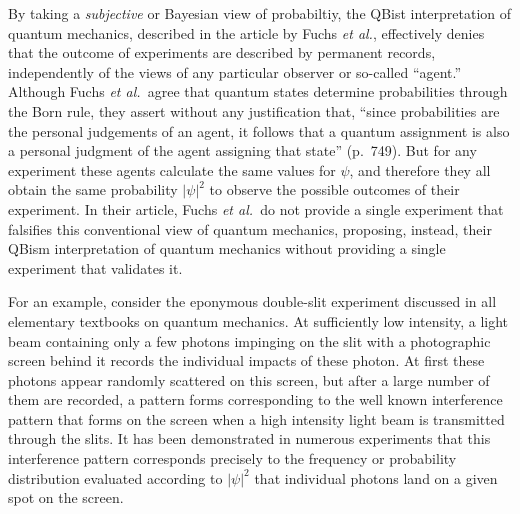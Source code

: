 \documentclass[prb,preprint]{revtex4-1}
\begin{document}
By taking a  {\it subjective} or Bayesian view of probabiltiy,  the QBist interpretation of quantum mechanics, described in the article by  Fuchs {\it et al.}, effectively denies that the outcome of experiments are described by permanent records, independently of the views of any particular  observer or so-called ``agent.''  Although Fuchs {\it et al.\ }agree that quantum states determine probabilities through the Born rule, they assert  without any justification that,  ``since probabilities are the personal judgements of an agent, it follows that a quantum assignment is also a personal judgment of the agent assigning that state'' (p.~749).  But for any  experiment  these  agents  calculate the same values for $\psi$, and therefore they all  obtain the same probability $|\psi |^2$  to observe the possible outcomes of their experiment.  In their article, Fuchs {\it et al.\ }do not provide a single experiment that falsifies  this conventional view of quantum mechanics, proposing, instead, their QBism interpretation of quantum mechanics without providing a single experiment that validates it. 



     




For an example, consider the eponymous double-slit experiment discussed in all elementary textbooks on quantum mechanics.  At sufficiently low intensity, a light beam containing only a few photons impinging on the slit with a photographic screen behind it records the individual impacts of these photon.  At  first these photons appear randomly scattered on this screen, but after a large number  of them are recorded, a pattern forms corresponding to the well known interference pattern that forms on the screen when a high intensity light beam is  transmitted through the slits.  It has been demonstrated in numerous experiments that this interference pattern corresponds precisely to the frequency or probability distribution evaluated according to $|\psi|^2$  that individual photons land on a given spot on the screen.
\end{document}
